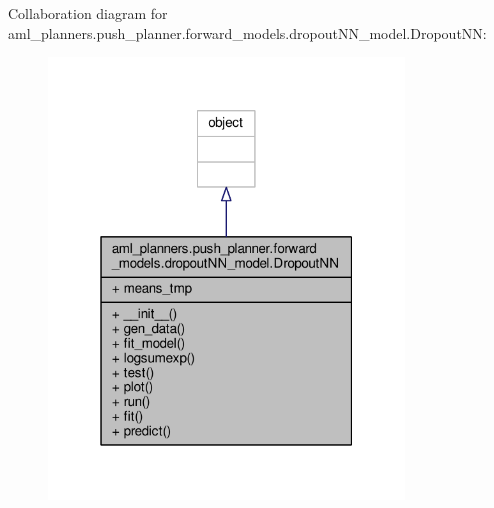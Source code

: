 Collaboration diagram for aml\-\_\-planners.\-push\-\_\-planner.\-forward\-\_\-models.\-dropout\-N\-N\-\_\-model.\-Dropout\-N\-N\-:
\nopagebreak
\begin{figure}[H]
\begin{center}
\leavevmode
\includegraphics[width=268pt]{classaml__planners_1_1push__planner_1_1forward__models_1_1dropout_n_n__model_1_1_dropout_n_n__coll__graph}
\end{center}
\end{figure}
